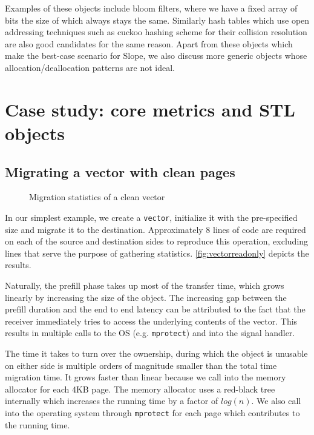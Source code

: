 Examples of these objects include bloom filters, where we have a fixed
array of bits the size of which always stays the same.
Similarly hash tables which use open addressing techniques such as cuckoo
hashing scheme for their collision resolution are also good candidates for the
same reason.
Apart from these objects which make the best-case scenario for Slope, we also
discuss more generic objects whose allocation/deallocation patterns are not
ideal.

\section{Case study: core metrics and STL objects}
\subsection{Migrating a vector with clean pages}
\label{sec:cleanvec}

\begin{figure}[tp]
    \begin{center}
        
    \end{center}
    \caption{Migration statistics of a clean vector}
    \label{fig:vectorreadonly}
\end{figure}

In our simplest example, we create a \texttt{vector}, initialize it with the
pre-specified size and migrate it to the destination. Approximately $8$ lines
of code are required on each of the source and destination sides to reproduce
this operation, excluding lines that serve the purpose of gathering statistics.
\autoref{fig:vectorreadonly} depicts the results.

Naturally, the prefill phase takes up most of the transfer time, which grows
linearly by increasing the size of the object. The increasing gap between the
prefill duration and the end to end latency can be attributed to the fact that
the receiver immediately tries to access the underlying contents of the vector.
This results in multiple calls to the OS (e.g. \texttt{mprotect}) and into the
signal handler.

The time it takes to turn over
the ownership, during which the object is unusable on either side is multiple
orders of magnitude smaller than the total time migration time.
It grows faster than linear because we call into the memory allocator
for each 4KB page. The memory allocator uses a red-black tree internally which
increases the running time by a factor of $log(n)$. We also call into the
operating system through \texttt{mprotect} for each page which contributes
to the running time.

